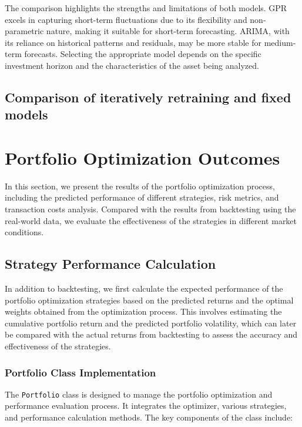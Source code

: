 The comparison highlights the strengths and limitations of both models. GPR excels in capturing short-term fluctuations due to its flexibility and non-parametric nature, making it suitable for short-term forecasting. ARIMA, with its reliance on historical patterns and residuals, may be more stable for medium-term forecasts. Selecting the appropriate model depends on the specific investment horizon and the characteristics of the asset being analyzed.


\subsection{Comparison of iteratively retraining and fixed models}


\section{Portfolio Optimization Outcomes}
In this section, we present the results of the portfolio optimization process, including the predicted performance of different strategies, risk metrics, and transaction costs analysis. Compared with the results from backtesting using the real-world data, we evaluate the effectiveness of the strategies in different market conditions.



\subsection{Strategy Performance Calculation}

In addition to backtesting, we first calculate the expected performance of the portfolio optimization strategies based on the predicted returns and the optimal weights obtained from the optimization process. This involves estimating the cumulative portfolio return and the predicted portfolio volatility, which can later be compared with the actual returns from backtesting to assess the accuracy and effectiveness of the strategies.

\subsubsection{Portfolio Class Implementation}

The \texttt{Portfolio} class is designed to manage the portfolio optimization and performance evaluation process. It integrates the optimizer, various strategies, and performance calculation methods. The key components of the class include:

